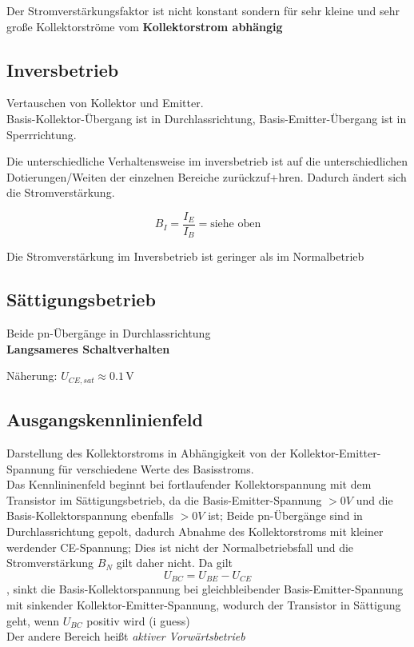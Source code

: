 \documentclass[a4paper, 12pt]{article}
\begin{document}
Der Stromverstärkungsfaktor ist nicht konstant sondern für sehr kleine und sehr
große Kollektorströme vom \textbf{Kollektorstrom abhängig}

\subsection*{Inversbetrieb}
Vertauschen von Kollektor und Emitter.\\
Basis-Kollektor-Übergang ist in Durchlassrichtung, Basis-Emitter-Übergang ist in Sperrrichtung.

Die unterschiedliche Verhaltensweise im inversbetrieb ist auf die
unterschiedlichen Dotierungen/Weiten der einzelnen Bereiche zurückzuf+hren.
Dadurch ändert sich die Stromverstärkung.

$$B_I = \frac{I_E}{I_B} = \textrm{siehe oben}$$

Die Stromverstärkung im Inversbetrieb ist geringer als im Normalbetrieb

\subsection*{Sättigungsbetrieb}
Beide pn-Übergänge in Durchlassrichtung\\
\textbf{Langsameres Schaltverhalten}

Näherung: $U_{CE,sat} \approx 0.1 \, \si{\volt}$

\subsection*{Ausgangskennlinienfeld}
Darstellung des Kollektorstroms in Abhängigkeit von der
Kollektor-Emitter-Spannung für verschiedene Werte des Basisstroms.\\

Das Kennlininenfeld beginnt bei fortlaufender Kollektorspannung mit dem
Transistor im Sättigungsbetrieb, da die Basis-Emitter-Spannung $> 0V$ und die
Basis-Kollektorspannung ebenfalls $> 0V$ ist; Beide pn-Übergänge sind in
Durchlassrichtung gepolt, dadurch Abnahme des Kollektorstroms mit kleiner
werdender CE-Spannung; Dies ist nicht der Normalbetriebsfall und die
Stromverstärkung $B_N$ gilt daher nicht. Da gilt
\[U_{BC} = U_{BE} - U_{CE}\],
sinkt die Basis-Kollektorspannung bei gleichbleibender Basis-Emitter-Spannung
mit sinkender Kollektor-Emitter-Spannung, wodurch der Transistor in Sättigung
geht, wenn $U_{BC}$ positiv wird (i guess)\\

Der andere Bereich heißt \emph{aktiver Vorwärtsbetrieb}
\end{document}
